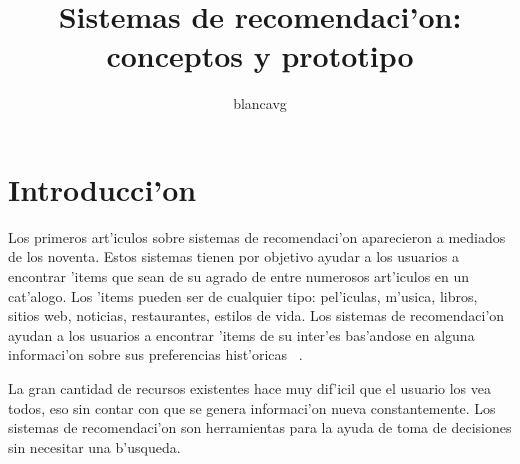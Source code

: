 \documentclass[11pt]{article}
\begin{document}
\title{Sistemas de recomendaci'on: conceptos y prototipo}
\author{blancavg}


\maketitle
\tableofcontents
\newpage
\section{Introducci'on}

Los primeros art'iculos sobre sistemas de recomendaci'on aparecieron a mediados de los noventa. Estos sistemas tienen por objetivo ayudar a los usuarios a encontrar 'items que sean de su agrado de entre numerosos art'iculos en un cat'alogo. Los 'items pueden ser de cualquier tipo: pel'iculas, m'usica, libros, sitios web, noticias, restaurantes, estilos de vida. Los sistemas de recomendaci'on ayudan a los usuarios a encontrar 'items de su inter'es bas'andose en alguna informaci'on sobre sus preferencias hist'oricas ~\cite{start:candillier09}.

La gran cantidad de recursos existentes hace muy dif'icil que el usuario los vea todos, eso sin contar con que se genera informaci'on nueva constantemente. Los sistemas de recomendaci'on son herramientas para la ayuda de toma de decisiones sin necesitar una b'usqueda. 
\end{document}
